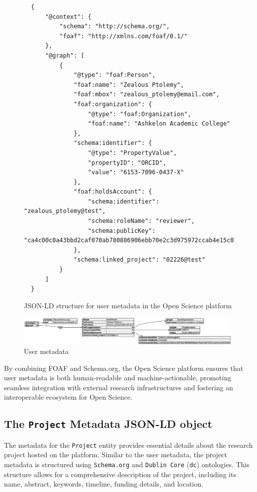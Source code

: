 \documentclass{article}
\begin{document}
\begin{figure}[h]
      \centering
      \caption{JSON-LD structure for user metadata in the Open Science platform}
      \label{jsonld:user}
      \begin{verbatim}
  {
      "@context": {
          "schema": "http://schema.org/",
          "foaf": "http://xmlns.com/foaf/0.1/"
      },
      "@graph": [
          {
              "@type": "foaf:Person",
              "foaf:name": "Zealous Ptolemy",
              "foaf:mbox": "zealous_ptolemy@email.com",
              "foaf:organization": {
                  "@type": "foaf:Organization",
                  "foaf:name": "Ashkelon Academic College"
              },
              "schema:identifier": {
                  "@type": "PropertyValue",
                  "propertyID": "ORCID",
                  "value": "6153-7096-0437-X"
              },
              "foaf:holdsAccount": {
                  "schema:identifier": "zealous_ptolemy@test",
                  "schema:roleName": "reviewer",
                  "schema:publicKey": "ca4c00c0a43bbd2caf070ab780886906ebb70e2c3d975972ccab4e15c01f33bd"
              },
              "schema:linked_project": "02226@test"
          }
      ]
  }
  \end{verbatim}
\end{figure}


\begin{figure}[htbp]
      \centering
      \includegraphics[width=0.98\textwidth, keepaspectratio]{user_metadata.eps}
      \caption{User metadata}
      \label{fig:user_metadata}
\end{figure}





By combining FOAF and Schema.org, the Open Science platform ensures that user metadata is both human-readable and machine-actionable, promoting seamless integration with external research infrastructures and fostering an interoperable ecosystem for Open Science.

\subsection{The \texttt{Project} Metadata JSON-LD object}

The metadata for the \texttt{Project} entity provides essential details about the research project hosted on the platform. Similar to the user metadata, the project metadata is structured using \texttt{Schema.org} and \texttt{Dublin Core} (\texttt{dc}) ontologies. This structure allows for a comprehensive description of the project, including its name, abstract, keywords, timeline, funding details, and location.
\end{document}

